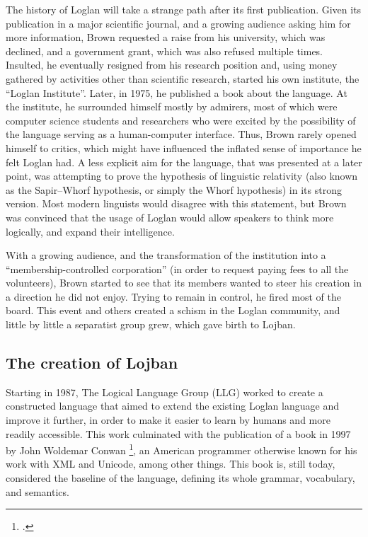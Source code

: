 The history of Loglan will take a strange path after its first publication. Given its publication in a major scientific journal, and a growing audience
asking him for more information, Brown requested a raise from his university, which was declined, and a government grant, which was also refused multiple times.
Insulted, he eventually resigned from his research position and, using money gathered by activities other than scientific research, started his own institute,
the ``Loglan Institute''. Later, in 1975, he published a book about the language. At the institute, he surrounded himself mostly by admirers, most of which were computer science
students and researchers who were excited by the possibility of the language serving as a human-computer interface. Thus, Brown rarely opened himself to critics,
which might have influenced the inflated sense of importance he felt Loglan had. A less explicit aim for the language, that was presented at a later point, was attempting
to prove the hypothesis of linguistic relativity (also known as the Sapir–Whorf hypothesis, or simply the Whorf hypothesis) in its strong version.
Most modern linguists would disagree with this statement, but Brown was convinced that the usage of Loglan would allow speakers to think more logically, and expand their
intelligence.\newline

With a growing audience, and the transformation of the institution into a ``membership-controlled corporation'' (in order to request paying fees to all the volunteers),
Brown started to see that its members wanted to steer his creation in a direction he did not enjoy. Trying to remain in control, he fired most of the board.
This event and others created a schism in the Loglan community, and little by little a separatist group grew, which gave birth to Lojban.

\subsection{The creation of Lojban}

Starting in 1987, The Logical Language Group (LLG) worked to create a constructed language that aimed to extend the existing Loglan language and improve it further,
in order to make it easier to learn by humans and more readily accessible. This work culminated with the publication of a book in 1997 by
John Woldemar Conwan \footcite{cowan1997complete}, an American programmer otherwise known for his work with XML and Unicode, among other things. This book is,
still today, considered the baseline of the language, defining its whole grammar, vocabulary, and semantics.\newline

